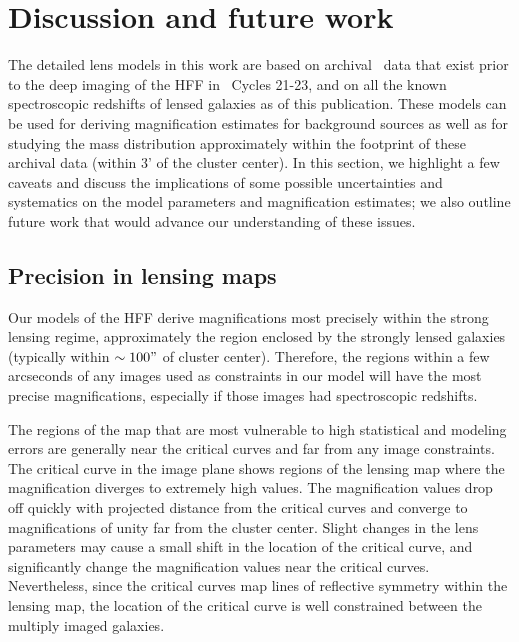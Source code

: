 \section{Discussion and future work}
\label{chap2:sec:discussion}

The detailed lens models in this work are based on archival \hst\ data that exist prior to the deep imaging of the HFF in \hst\ Cycles 21-23, and on all the known spectroscopic redshifts of lensed galaxies as of this publication. These models can be used for deriving magnification estimates for background sources as well as for studying the mass distribution approximately within the footprint of these archival data (within 3' of the cluster center). In this section, we highlight a few caveats and discuss the implications of some possible uncertainties and systematics on the model parameters and magnification estimates; we also outline future work that would advance our understanding of these issues. 

\subsection{Precision in lensing maps}
\label{chap2:sec:precision}

Our models of the HFF derive magnifications most precisely within the strong lensing regime, approximately the region enclosed by the strongly lensed galaxies (typically within $\sim100"$ of cluster center). Therefore, the regions within a few arcseconds of any images used as constraints in our model will have the most precise magnifications, especially if those images had spectroscopic redshifts.

The regions of the map that are most vulnerable to high statistical and modeling errors are generally near the critical curves and far from any image constraints. The critical curve in the image plane shows regions of the lensing map where the magnification diverges to extremely high values. The magnification values drop off quickly with projected distance from the critical curves and converge to magnifications of unity far from the cluster center. Slight changes in the lens parameters may cause a small shift in the location of the critical curve, and significantly change the magnification values near the critical curves. Nevertheless, since the critical curves map lines of reflective symmetry within the lensing map, the location of the critical curve is well constrained between the multiply imaged galaxies.

